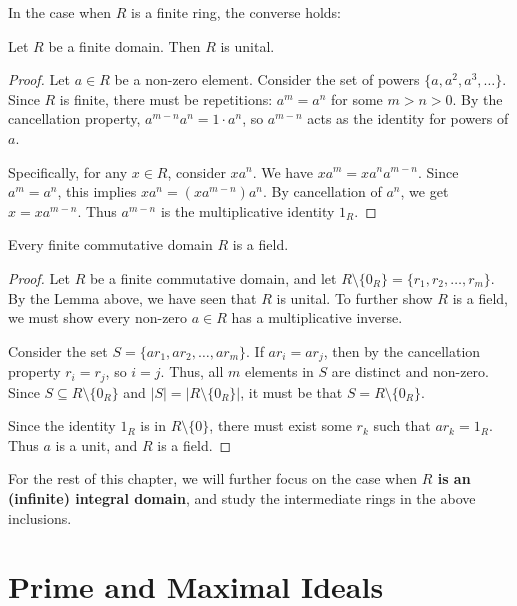 In the case when $R$ is a finite ring, the converse holds:
\begin{lemma}
Let $R$ be a finite domain. Then $R$ is unital.
\end{lemma}

\begin{proof}
Let $a \in R$ be a non-zero element. Consider the set of powers $\{a, a^2, a^3, \dots\}$. Since $R$ is finite, there must be repetitions: $a^m = a^n$ for some $m > n > 0$. By the cancellation property, $a^{m-n} a^n = 1 \cdot a^n$, so $a^{m-n}$ acts as the identity for powers of $a$. 

Specifically, for any $x \in R$, consider $x a^n$. We have $x a^m = x a^n a^{m-n}$. Since $a^m = a^n$, this implies $x a^n = (x a^{m-n}) a^n$. By cancellation of $a^n$, we get $x = x a^{m-n}$. Thus $a^{m-n}$ is the multiplicative identity $1_R$.
\end{proof}

\begin{proposition}
Every finite commutative domain $R$ is a field.
\end{proposition}

\begin{proof}
Let $R$ be a finite commutative domain, and let $R \setminus \{0_R\} = \{r_1, r_2, \dots, r_m\}$. By the Lemma above, we have seen that $R$ is unital.
To further show $R$ is a field, we must show every non-zero $a \in R$ has a multiplicative inverse. 

Consider the set $S = \{ar_1, ar_2, \dots, ar_m\}$. If $ar_i = ar_j$, then by the cancellation property $r_i = r_j$, so $i = j$. Thus, all $m$ elements in $S$ are distinct and non-zero. Since $S \subseteq R \setminus \{0_R\}$ and $|S| = |R \setminus \{0_R\}|$, it must be that $S = R \setminus \{0_R\}$. 

Since the identity $1_R$ is in $R \setminus \{0\}$, there must exist some $r_k$ such that $ar_k = 1_R$. Thus $a$ is a unit, and $R$ is a field.
\end{proof}


For the rest of this chapter, we will further focus on the case when {\bf $R$ is an (infinite) integral domain}, and study the intermediate rings in the above inclusions.









\section{Prime and Maximal Ideals}

